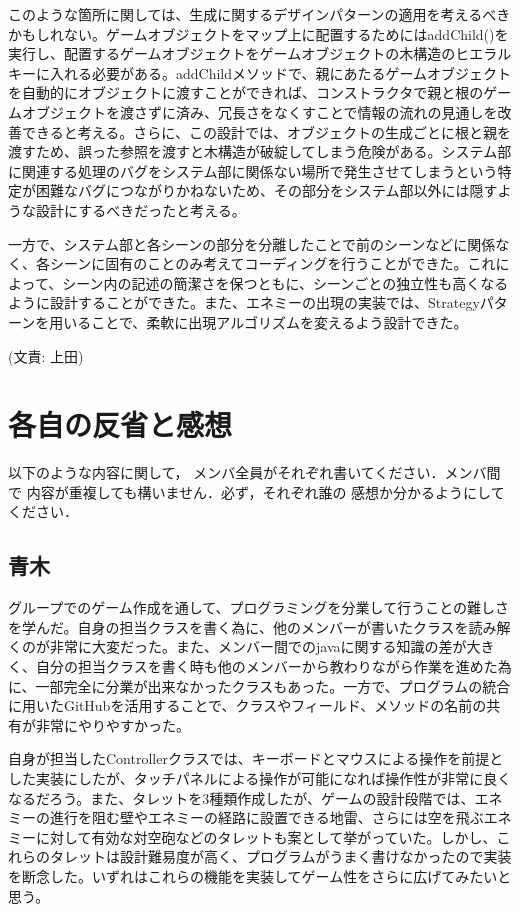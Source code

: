 \documentclass[11pt,a4j]{jarticle}
\begin{document}
このような箇所に関しては、生成に関するデザインパターンの適用を考えるべきかもしれない。ゲームオブジェクトをマップ上に配置するためにはaddChild()を実行し、配置するゲームオブジェクトをゲームオブジェクトの木構造のヒエラルキーに入れる必要がある。addChildメソッドで、親にあたるゲームオブジェクトを自動的にオブジェクトに渡すことができれば、コンストラクタで親と根のゲームオブジェクトを渡さずに済み、冗長さをなくすことで情報の流れの見通しを改善できると考える。さらに、この設計では、オブジェクトの生成ごとに根と親を渡すため、誤った参照を渡すと木構造が破綻してしまう危険がある。システム部に関連する処理のバグをシステム部に関係ない場所で発生させてしまうという特定が困難なバグにつながりかねないため、その部分をシステム部以外には隠すような設計にするべきだったと考える。

一方で、システム部と各シーンの部分を分離したことで前のシーンなどに関係なく、各シーンに固有のことのみ考えてコーディングを行うことができた。これによって、シーン内の記述の簡潔さを保つともに、シーンごとの独立性も高くなるように設計することができた。また、エネミーの出現の実装では、Strategyパターンを用いることで、柔軟に出現アルゴリズムを変えるよう設計できた。

(文責: 上田)

\section{各自の反省と感想}
以下のような内容に関して，
メンバ全員がそれぞれ書いてください．メンバ間で
内容が重複しても構いません．必ず，それぞれ誰の
感想か分かるようにしてください．

\subsection{青木}

グループでのゲーム作成を通して、プログラミングを分業して行うことの難しさを学んだ。自身の担当クラスを書く為に、他のメンバーが書いたクラスを読み解くのが非常に大変だった。また、メンバー間でのjavaに関する知識の差が大きく、自分の担当クラスを書く時も他のメンバーから教わりながら作業を進めた為に、一部完全に分業が出来なかったクラスもあった。一方で、プログラムの統合に用いたGitHubを活用することで、クラスやフィールド、メソッドの名前の共有が非常にやりやすかった。

自身が担当したControllerクラスでは、キーボードとマウスによる操作を前提とした実装にしたが、タッチパネルによる操作が可能になれば操作性が非常に良くなるだろう。また、タレットを3種類作成したが、ゲームの設計段階では、エネミーの進行を阻む壁やエネミーの経路に設置できる地雷、さらには空を飛ぶエネミーに対して有効な対空砲などのタレットも案として挙がっていた。しかし、これらのタレットは設計難易度が高く、プログラムがうまく書けなかったので実装を断念した。いずれはこれらの機能を実装してゲーム性をさらに広げてみたいと思う。
\end{document}
